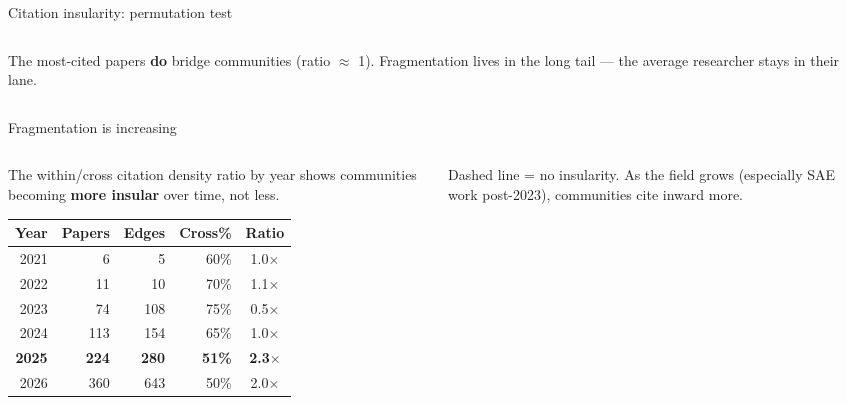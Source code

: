 \documentclass[aspectratio=169,11pt]{beamer}
\begin{document}
\begin{frame}[label=citationtest]{Citation insularity: permutation test}
\begin{columns}[T]
\begin{column}{0.49\textwidth}
\vspace{0.5em}
\raggedright
{\small The most-cited papers \textbf{do} bridge communities (ratio $\approx$ 1). Fragmentation lives in the long tail --- the average researcher stays in their lane.}
\end{column}
\end{columns}
\end{frame}

\begin{frame}[label=temporal]{Fragmentation is increasing}
\begin{columns}[T]
\begin{column}{0.50\textwidth}
{\small The within/cross citation density ratio by year shows communities becoming \textbf{more insular} over time, not less.}

\vspace{0.5em}
\centering
{\scriptsize
\begin{tabular}{rrrrc}
\toprule
\textbf{Year} & \textbf{Papers} & \textbf{Edges} & \textbf{Cross\%} & \textbf{Ratio} \\
\midrule
2021 & 6 & 5 & 60\% & 1.0$\times$ \\
2022 & 11 & 10 & 70\% & 1.1$\times$ \\
2023 & 74 & 108 & 75\% & 0.5$\times$ \\
2024 & 113 & 154 & 65\% & 1.0$\times$ \\
\textbf{2025} & \textbf{224} & \textbf{280} & \textbf{51\%} & \textbf{2.3$\times$} \\
2026 & 360 & 643 & 50\% & 2.0$\times$ \\
\bottomrule
\end{tabular}
}
\end{column}
\begin{column}{0.47\textwidth}
\vspace{0.3em}
\centering
{}

\vspace{0.3em}
{\scriptsize Dashed line = no insularity. As the field grows (especially SAE work post-2023), communities cite inward more.}
\end{column}
\end{columns}
\end{frame}
\end{document}
